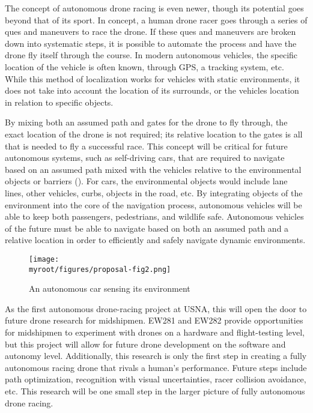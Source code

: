 \documentclass[onecolumn,10pt]{IEEEtran}
\newcommand{\myroot}{../}
\begin{document}
The concept of autonomous drone racing is even newer, though its potential goes beyond that of its sport. In concept, a human drone racer goes through a series of ques and maneuvers to race the drone. If these ques and maneuvers are broken down into systematic steps, it is possible to automate the process and have the drone fly itself through the course. In modern autonomous vehicles, the specific location of the vehicle is often known, through GPS, a tracking system, etc. While this method of localization works for vehicles with static environments, it does not take into account the location of its surrounds, or the vehicles location in relation to specific objects. 

By mixing both an assumed path and gates for the drone to fly through, the exact location of the drone is not required; its relative location to the gates is all that is needed to fly a successful race. This concept will be critical for future autonomous systems, such as self-driving cars, that are required to navigate based on an assumed path mixed with the vehicles relative to the environmental objects or barriers (). For cars, the environmental objects would include lane lines, other vehicles, curbs, objects in the road, etc. By integrating objects of the environment into the core of the navigation process, autonomous vehicles will be able to keep both passengers, pedestrians, and wildlife safe. Autonomous vehicles of the future must be able to navigate based on both an assumed path and a relative location in order to efficiently and safely navigate dynamic environments.  
\begin{figure}
\begin{center}
\texttt{[image: \\myroot/figures/proposal-fig2.png]}
\end{center}
\caption{An autonomous car sensing its environment}
\label{fig:2}
\end{figure}

As the first autonomous drone-racing project at USNA, this will open the door to future drone research for midshipmen. EW281 and EW282 provide opportunities for midshipmen to experiment with drones on a hardware and flight-testing level, but this project will allow for future drone development on the software and autonomy level. Additionally, this research is only the first step in creating a fully autonomous racing drone that rivals a human’s performance. Future steps include path optimization, recognition with visual uncertainties, racer collision avoidance, etc. This research will be one small step in the larger picture of fully autonomous drone racing.
\end{document}
